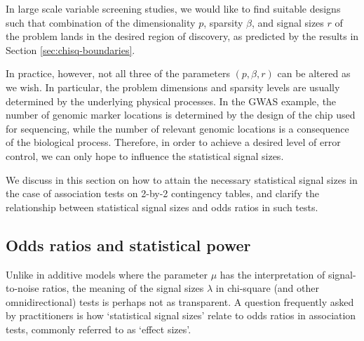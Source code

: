 
In large scale variable screening studies, we would like to find suitable designs such that combination of the dimensionality $p$, sparsity $\beta$, and signal sizes $r$ of the problem lands in the desired region of discovery, as predicted by the results in Section \ref{sec:chisq-boundaries}.

In practice, however, not all three of the parameters $(p, \beta, r)$ can be altered as we wish.
In particular, the problem dimensions and sparsity levels are usually determined by the underlying physical processes.
In the GWAS example, the number of genomic marker locations is determined by the design of the chip used for sequencing, while the number of relevant genomic locations is a consequence of the biological process.
Therefore, in order to achieve a desired level of error control, we can only hope to influence the statistical signal sizes.

We discuss in this section on how to attain the necessary statistical signal sizes in the case of association tests on 2-by-2 contingency tables, and clarify the relationship between statistical signal sizes and odds ratios in such tests.

\subsection{Odds ratios and statistical power}
\label{subsec:odds-and-power}

Unlike in additive models where the parameter $\mu$ has the interpretation of signal-to-noise ratios, the meaning of the signal sizes $\lambda$ in chi-square (and other omnidirectional) tests is perhaps not as transparent.
A question frequently asked by practitioners is how `statistical signal sizes' relate to odds ratios in association tests, commonly referred to as `effect sizes'.

